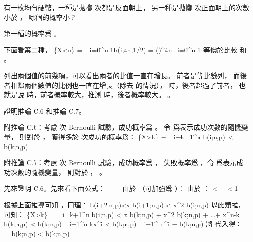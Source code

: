 \startsection[
  title={The tails of the binomial distribution},
]

\startEXERCISE\DIFFICULT
有一枚均勻硬幣，一種是拋擲  次都是反面朝上，
另一種是拋擲  次正面朝上的次數小於 ，
哪個的概率小？
\stopEXERCISE

\startANSWER
第一種的概率爲 。

下面看第二種，
\startformula\startmathalignment
\NC \Pr\{X<n\}
    \NC = \sum_{i=0}^{n-1}b(i;4n,1/2) \NR
\NC \NC = \left(\right)^{4n}\sum_{i=0}^{n-1} \NR
\stopmathalignment\stopformula
等價於比較  和 。

列出兩個值的前幾項，可以看出兩者的比值一直在增長。
前者是等比數列，
而後者相鄰兩個數值的比例也一直在增長（除去  的情況），
  時，後者超過了前者，
也就是說  時，前者概率較大，推測  時，後者概率較大。
。


\stopANSWER

\startEXERCISE\DIFFICULT
證明推論 C.6 和推論 C.7。

附推論 C.6：考慮  次 Bernoulli 試驗，成功概率爲 。
令  爲表示成功次數的隨機變量，
則對於 ，
獲得多於  次成功的概率爲：
\startformula
\Pr\{X>k\} = \sum_{i=k+1}^{n} b(i;n,p) <  b(k;n,p)
\stopformula

附推論 C.7：考慮  次 Bernoulli 試驗，成功概率爲 ，
失敗概率爲 ，令  爲表示成功次數的隨機變量，
則對於 ， 。
\stopEXERCISE

\startANSWER
先來證明 C.6。先來看下面公式：
\startformula\startmathalignment
\NC {}
    \NC =  \NR
\NC \NC =   \NR
\startintertext
由於  （可加強爲 ）：
\stopintertext
\NC \NC \le {}  \qquad \qquad {}\NR
\startintertext
由於 ：
\stopintertext
\NC \NC <  \NR
\NC \NC =  \NR
\NC \NC < 1 \NR
\stopmathalignment\stopformula

根據上面推導可知 ，同理：
\startformula
b(i+2;n,p)<x b(i+1;n,p) < x^2 b(i;n,p)
\stopformula
以此類推，可知：
\startformula\startmathalignment
\NC \Pr\{X>k\} = \sum_{i=k+1}^{n} b(i;n,p)
    \NC < x b(k;n,p) + x^2 b(k;n,p) + \ldots + x^{n-k} b(k;n,p) \NR
\NC \NC < b(k;n,p) \sum_{i=1}^{n-k}x^i \NR
\NC \NC < b(k;n,p) \sum_{i=1}^{\infty} x^i \NR
\NC \NC = b(k;n,p)  \NR
\startintertext
將  代入得：
\stopintertext
\NC \NC = b(k;n,p)  \NR
\NC \NC <  b(k;n,p) \NR
\stopmathalignment\stopformula

